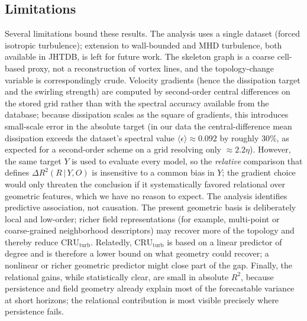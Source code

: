 \documentclass[11pt,a4paper]{article}
\begin{document}
\subsection{Limitations}
Several limitations bound these results. The analysis uses a single dataset (forced isotropic turbulence); extension to wall-bounded and MHD turbulence, both available in JHTDB, is left for future work. The skeleton graph is a coarse cell-based proxy, not a reconstruction of vortex lines, and the topology-change variable is correspondingly crude. Velocity gradients (hence the dissipation target and the swirling strength) are computed by second-order central differences on the stored grid rather than with the spectral accuracy available from the database; because dissipation scales as the square of gradients, this introduces small-scale error in the absolute target (in our data the central-difference mean dissipation exceeds the dataset's spectral value $\langle\epsilon\rangle \approx 0.092$ by roughly 30\%, as expected for a second-order scheme on a grid resolving only $\approx 2.2\eta$). However, the same target $Y$ is used to evaluate every model, so the \emph{relative} comparison that defines $\Delta R^2(R\,|\,Y,O)$ is insensitive to a common bias in $Y$; the gradient choice would only threaten the conclusion if it systematically favored relational over geometric features, which we have no reason to expect. The analysis identifies predictive association, not causation. The present geometric basis is deliberately local and low-order; richer field representations (for example, multi-point or coarse-grained neighborhood descriptors) may recover more of the topology and thereby reduce $\mathrm{CRU}_{\text{turb}}$. Relatedly, $\mathrm{CRU}_{\text{turb}}$ is based on a linear predictor of degree and is therefore a lower bound on what geometry could recover; a nonlinear or richer geometric predictor might close part of the gap. Finally, the relational gains, while statistically clear, are small in absolute $R^2$, because persistence and field geometry already explain most of the forecastable variance at short horizons; the relational contribution is most visible precisely where persistence fails.
\end{document}

